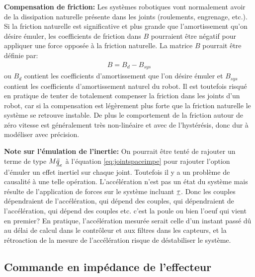 \textbf{Compensation de friction: } Les systèmes robotiques vont normalement avoir de la dissipation naturelle présente dans les joints (roulements, engrenage, etc.). Si la friction naturelle est significative et plus grande que l'amortissement qu'on désire émuler, les coefficients de friction dans $B$ pourraient être négatif pour appliquer une force opposée à la friction naturelle. La matrice $B$ pourrait être définie par:
\begin{align}
B = B_{d} - B_{sys}
\end{align}
ou $B_{d}$ contient les coefficients d'amortissement que l'on désire émuler et $B_{sys}$ contient les coefficients d'amortissement naturel du robot. Il est toutefois risqué en pratique de tenter de totalement compenser la friction dans les joints d'un robot, car si la compensation est légèrement plus forte que la friction naturelle le système se retrouve instable. De plus le comportement de la friction autour de zéro vitesse est généralement très non-linéaire et avec de l'hystérésis, donc dur à modéliser avec précision. 

\textbf{Note sur l'émulation de l'inertie: } On pourrait être tenté de rajouter un terme de type $M \underline{\ddot{q}}_e$ à l'équation \eqref{eq:jointspaceimpe} pour rajouter l'option d'émuler un effet inertiel sur chaque joint. Toutefois il y a un problème de causalité à une telle opération. L'accélération n'est pas un état du système mais résulte de l'application de forces sur le système incluant $\underline{\tau}$. Donc les couples dépendraient de l'accélération, qui dépend des couples, qui dépendraient de l'accélération, qui dépend des couples etc. c'est la poule ou bien l'oeuf qui vient en premier? En pratique, l'accélération mesurée serait celle d'un instant passé dû au délai de calcul dans le contrôleur et aux filtres dans les capteurs, et la rétroaction de la mesure de l'accélération risque de déstabiliser le système.


\subsection{Commande en impédance de l'effecteur}
\label{sec:effimpcontrol}

